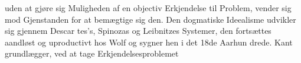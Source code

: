 \documentclass[12pt,a4paper]{book}
\begin{document}
%
%
uden at gjøre sig Muligheden af en objectiv Erkjendelse til
Problem, vender sig mod Gjenstanden for at bemægtige sig
den. Den dogmatiske Ideealisme udvikler sig gjennem Descar\-%
tes's, Spinozas og Leibnitzes Systemer, den fortsættes aandløst
og uproductivt hos Wolf og sygner hen i det 18de Aarhun\-%
drede. Kant grundlægger, ved at tage Erkjendelsesproblemet
\end{document}
